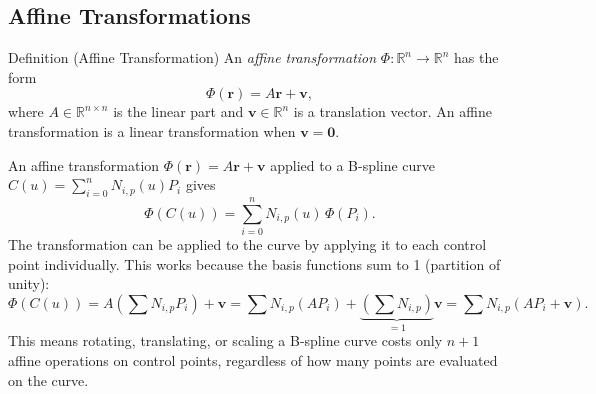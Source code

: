 \subsection*{Affine Transformations}

\begin{propositionbox}{Definition (Affine Transformation)}
An \emph{affine transformation} $\Phi : \mathbb{R}^n \to \mathbb{R}^n$ has the form
\[
  \Phi(\mathbf{r}) = A\mathbf{r} + \mathbf{v},
\]
where $A \in \mathbb{R}^{n \times n}$ is the linear part and $\mathbf{v} \in \mathbb{R}^n$
is a translation vector.
An affine transformation is a linear transformation when $\mathbf{v} = \mathbf{0}$.
\end{propositionbox}

\begin{remark*}
An affine transformation $\Phi(\mathbf{r}) = A\mathbf{r} + \mathbf{v}$ applied to
a B-spline curve $C(u) = \sum_{i=0}^n N_{i,p}(u) P_i$ gives
\[
  \Phi(C(u)) = \sum_{i=0}^n N_{i,p}(u)\,\Phi(P_i).
\]
The transformation can be applied to the curve by applying it to each
control point individually.
This works because the basis functions sum to 1 (partition of unity):
\[
  \Phi(C(u)) = A\!\left(\sum N_{i,p} P_i\right) + \mathbf{v}
             = \sum N_{i,p} (AP_i) + \underbrace{\left(\sum N_{i,p}\right)}_{=1}\mathbf{v}
             = \sum N_{i,p}(AP_i + \mathbf{v}).
\]
This means rotating, translating, or scaling a B-spline curve costs only
$n+1$ affine operations on control points, regardless of how many points
are evaluated on the curve.
\end{remark*}
